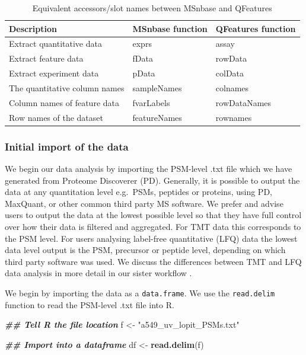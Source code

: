 \documentclass[9pt,a4paper,]{extarticle}
\newenvironment{Shaded}{\begin{snugshade}}{\end{snugshade}}
\newcommand{\DocumentationTok}[1]{\textcolor[rgb]{0.56,0.35,0.01}{\textbf{\textit{#1}}}}
\newcommand{\FunctionTok}[1]{\textcolor[rgb]{0.13,0.29,0.53}{\textbf{#1}}}
\newcommand{\NormalTok}[1]{#1}
\newcommand{\OtherTok}[1]{\textcolor[rgb]{0.56,0.35,0.01}{#1}}
\newcommand{\StringTok}[1]{\textcolor[rgb]{0.31,0.60,0.02}{#1}}
\begin{document}
\begin{table}[H]
\centering
\caption{\label{tab:qf-msnset-tab}Equivalent accessors/slot names between MSnbase and QFeatures}
\centering
\begin{tabular}[t]{l|l|l}
\hline
Description & MSnbase function & QFeatures function\\
\hline
Extract quantitative data & exprs & assay\\
\hline
Extract feature data & fData & rowData\\
\hline
Extract experiment data & pData & colData\\
\hline
The quantitative column names & sampleNames & colnames\\
\hline
Column names of feature data & fvarLabels & rowDataNames\\
\hline
Row names of the dataset & featureNames & rownames\\
\hline
\end{tabular}
\end{table}

\subsubsection{Initial import of the data}\label{initial-import-of-the-data}

We begin our data analysis by importing the PSM-level .txt file which we have
generated from Proteome Discoverer (PD). Generally, it is possible to output the
data at any quantitation level e.g.~PSMs, peptides or proteins, using PD,
MaxQuant, or other common third party MS software. We prefer and advise users to
output the data at the lowest possible level so that they have full control over
how their data is filtered and aggregated. For TMT data this corresponds to the
PSM level. For users analysing label-free quantitative (LFQ) data the lowest
data level output is the PSM, precursor or peptide level, depending on which
third party software was used. We discuss the differences between TMT and LFQ
data analysis in more detail in our sister workflow \citep{Hutchings2023}.

We begin by importing the data as a \texttt{data.frame}. We use the \texttt{read.delim} function
to read the PSM-level .txt file into R.

\begin{Shaded}
\begin{Highlighting}[]
\DocumentationTok{\#\# Tell R the file location}
\NormalTok{f }\OtherTok{\textless{}{-}} \StringTok{"a549\_uv\_lopit\_PSMs.txt"}

\DocumentationTok{\#\# Import into a dataframe}
\NormalTok{df }\OtherTok{\textless{}{-}} \FunctionTok{read.delim}\NormalTok{(f)}
\end{Highlighting}
\end{Shaded}
\end{document}
